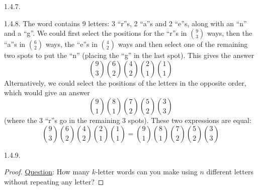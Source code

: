 \begin {itemize}
\begin{ans}{1.4.7.}
	
\end{ans}
\begin{ans}{1.4.8.}
		The word contains 9 letters: 3 ``r''s, 2 ``a''s and 2 ``e''s, along with an ``n'' and a ``g''.  We could first select the positions for the ``r''s in ${9 \choose 3}$ ways, then the ``a''s in ${6 \choose 2}$ ways, the ``e''s in ${4 \choose 2}$ ways and then select one of the remaining two spots to put the ``n'' (placing the ``g'' in the last spot).  This gives the answer
		\[{9 \choose 3}{6 \choose 2}{4 \choose 2}{2\choose 1}{1\choose 1}\]
		Alternatively, we could select the positions of the letters in the opposite order, which would give an answer
		\[{9 \choose 1}{8\choose 1}{7 \choose 2}{5\choose 2}{3\choose 3}\]
		(where the 3 ``r''s go in the remaining 3 spots).  These two expressions are equal:
		\[{9 \choose 3}{6 \choose 2}{4 \choose 2}{2\choose 1}{1\choose 1} = {9 \choose 1}{8\choose 1}{7 \choose 2}{5\choose 2}{3\choose 3}\]
	
\end{ans}
\begin{ans}{1.4.9.}
		\begin{proof}
         \underline{Question}: How many $k$-letter words can you make using $n$ different letters without repeating any letter?


\end{proof}
\end{ans}
\end{itemize}
